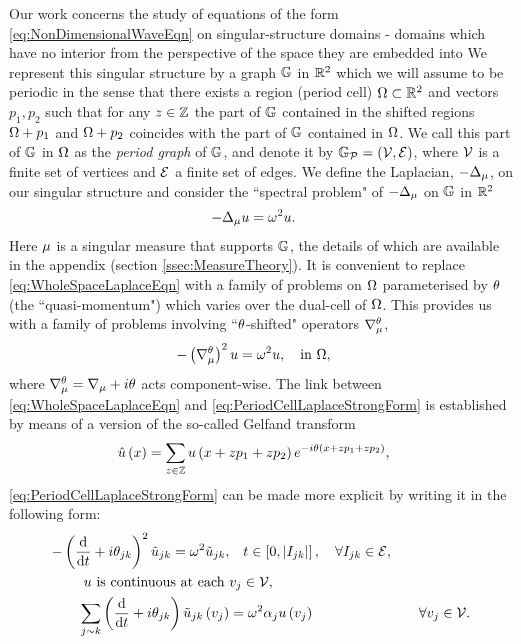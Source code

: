 Our work concerns the study of equations of the form \eqref{eq:NonDimensionalWaveEqn} on singular-structure domains - domains which have no interior from the perspective of the space they are embedded into 
We represent this singular structure by a graph $\mathbb{G}$ in $\mathbb{R}^2$ which we will assume to be periodic in the sense that there exists a region (period cell) $\Omega\subset\mathbb{R}^2$ and vectors $p_1, p_2$ such that for any $z\in\mathbb{Z}$ the part of $\mathbb{G}$ contained in the shifted regions $\Omega+p_1$ and $\Omega+p_2$ coincides with the part of $\mathbb{G}$ contained in $\Omega$.
We call this part of $\mathbb{G}$ in $\Omega$ as the \emph{period graph} of $\mathbb{G}$, and denote it by $\mathbb{G}_{\mathcal{P}}=\left( \mathcal{V}, \mathcal{E} \right)$, where $\mathcal{V}$ is a finite set of vertices and $\mathcal{E}$ a finite set of edges.
We define the Laplacian, $-\Delta_{\mu}$, on our singular structure and consider the ``spectral problem" of $-\Delta_{\mu}$ on $\mathbb{G}$ in $\mathbb{R}^2$
\begin{align} \label{eq:WholeSpaceLaplaceEqn}
	-\Delta_{\mu} u &= \omega^2 u.
\end{align}
Here $\mu$ is a singular measure that supports $\mathbb{G}$, the details of which are available in the appendix (section \ref{ssec:MeasureTheory}).
It is convenient to replace \eqref{eq:WholeSpaceLaplaceEqn} with a family of problems on $\Omega$ parameterised by $\theta$ (the ``quasi-momentum") which varies over the dual-cell of $\Omega$.
This provides us with a family of problems involving ``$\theta$-shifted" operators $\nabla^{\theta}_{\mu}$,
\begin{align} \label{eq:PeriodCellLaplaceStrongForm}
	-\left( \nabla^{\theta}_{\mu} \right)^2 u &= \omega^2 u, \quad\text{in } \Omega,
\end{align}
where $\nabla^{\theta}_{\mu} = \nabla_{\mu} + i\theta$ acts component-wise.
The link between \eqref{eq:WholeSpaceLaplaceEqn} and \eqref{eq:PeriodCellLaplaceStrongForm} is established by means of a version of the so-called Gelfand transform 
\begin{align*}
	\hat{u}\left( x \right) &= \sum_{z\in\mathbb{Z}}u\left( x+zp_1+zp_2 \right)e^{-i\theta\left( x+zp_1+zp_2 \right)},
\end{align*}
\eqref{eq:PeriodCellLaplaceStrongForm} can be made more explicit by writing it in the following form:
\begin{subequations} \label{eq:QGFullSystem}
	\begin{align}
		-\left( \dfrac{\mathrm{d}}{\mathrm{d}t} + i\theta_{jk} \right)^2 \tilde{u}_{jk} = \omega^2 \tilde{u}_{jk}, &\quad t\in\left[ 0,\left\lvert I_{jk} \right\rvert \right], \quad \forall I_{jk}\in \mathcal{E}, \label{eq:QGEdgeODEs} \\
		u \text{ is continuous at each } &v_j \in \mathcal{V}, \label{eq:QGVertCty}\\
		\sum_{j\sim k}\left( \dfrac{\mathrm{d}}{\mathrm{d}t} + i\theta_{jk} \right)\tilde{u}_{jk}\left( v_j \right) &= \omega^2\alpha_{j}u\left( v_j \right) &\quad \forall v_j \in \mathcal{V}. \label{eq:QGDerivCondition}
	\end{align}
\end{subequations}
